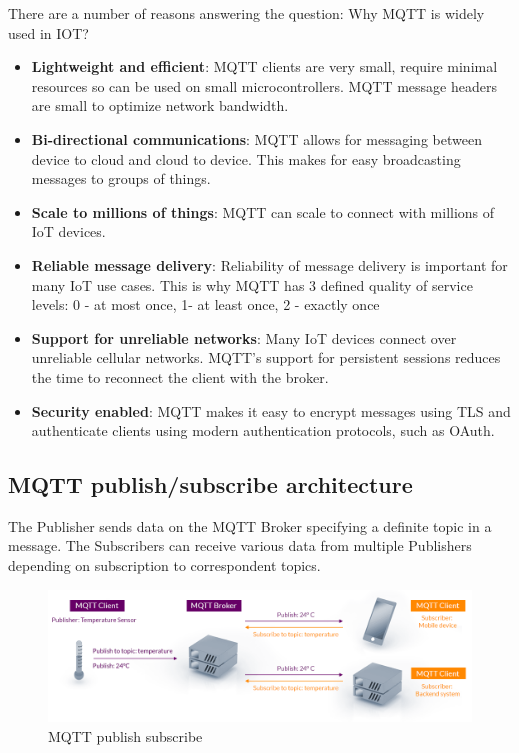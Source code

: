 \documentclass[\main/main.tex]{subfiles}
\begin{document}
There are a number of reasons answering the question: Why MQTT is widely used in IOT? 
\begin{itemize}
    \item \textbf{Lightweight and efficient}: MQTT clients are very small, require minimal resources so can be used on small microcontrollers. MQTT message headers are small to optimize network bandwidth.
    \item \textbf{Bi-directional communications}: MQTT allows for messaging between device to cloud and cloud to device. This makes for easy broadcasting messages to groups of things.
    \item \textbf{Scale to millions of things}: MQTT can scale to connect with millions of IoT devices.
    \item \textbf{Reliable message delivery}: Reliability of message delivery is important for many IoT use cases. This is why MQTT has 3 defined quality of service levels: 0 - at most once, 1- at least once, 2 - exactly once
    \item \textbf{Support for unreliable networks}: Many IoT devices connect over unreliable cellular networks. MQTT’s support for persistent sessions reduces the time to reconnect the client with the broker.
    \item \textbf{Security enabled}: MQTT makes it easy to encrypt messages using TLS and authenticate clients using modern authentication protocols, such as OAuth.
\end{itemize}

\subsection{MQTT publish/subscribe architecture}
The Publisher sends data on the MQTT Broker specifying a definite topic in a message. The Subscribers can receive various data from multiple Publishers depending on subscription to correspondent topics.
\begin{figure}[H]
    \begin{center}
        \includegraphics[scale=0.4]{mqtt-publish-subscribe.png}
    \end{center}
    \caption{MQTT publish subscribe}
    \label{fig:mqtt_publish_subscribe.}
\end{figure}
\end{document}
